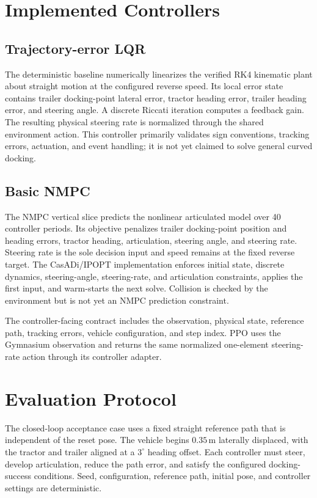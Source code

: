 \documentclass[conference]{IEEEtran}
\begin{document}
\section{Implemented Controllers}

\subsection{Trajectory-error LQR}

The deterministic baseline numerically linearizes the verified RK4 kinematic
plant about straight motion at the configured reverse speed. Its local error
state contains trailer docking-point lateral error, tractor heading error,
trailer heading error, and steering angle. A discrete Riccati iteration
computes a feedback gain. The resulting physical steering rate is normalized
through the shared environment action. This controller primarily validates
sign conventions, tracking errors, actuation, and event handling; it is not
yet claimed to solve general curved docking.

\subsection{Basic NMPC}

The NMPC vertical slice predicts the nonlinear articulated model over 40
controller periods. Its objective penalizes trailer docking-point position and
heading errors, tractor heading, articulation, steering angle, and steering
rate. Steering rate is the sole decision input and speed remains at the fixed
reverse target. The CasADi/IPOPT implementation \cite{andersson2019casadi}
enforces initial state, discrete dynamics, steering-angle, steering-rate, and
articulation constraints, applies the first input, and warm-starts the next
solve. Collision is checked by the environment but is not yet an NMPC
prediction constraint.

The controller-facing contract includes the observation, physical state,
reference path, tracking errors, vehicle configuration, and step index. PPO
uses the Gymnasium observation and returns the same normalized one-element
steering-rate action through its controller adapter.

\section{Evaluation Protocol}

The closed-loop acceptance case uses a fixed straight reference path that is
independent of the reset pose. The vehicle begins $0.35\,\mathrm{m}$ laterally
displaced, with the tractor and trailer aligned at a $3^\circ$ heading offset.
Each controller must steer, develop articulation, reduce the path error, and
satisfy the configured docking-success conditions. Seed, configuration,
reference path, initial pose, and controller settings are deterministic.
\end{document}
